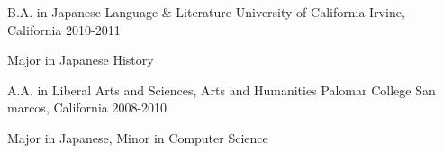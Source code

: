 \begin{cventries}
    \cventry
        {B.A. in Japanese Language \& Literature} %
        {University of California} %
        {Irvine, California} %
        {2010-2011} %
        {
            \begin{cvitems} %
            \item {Major in Japanese History}
            \end{cvitems}
        }

    \cventry
        {A.A. in Liberal Arts and Sciences, Arts and Humanities} %
        {Palomar College} %
        {San marcos, California} %
        {2008-2010} %
        {
            \begin{cvitems} %
            \item {Major in Japanese, Minor in Computer Science}
            \end{cvitems}
        }


\end{cventries}
